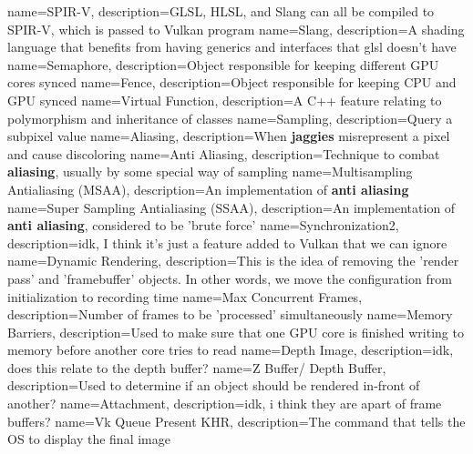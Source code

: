 \documentclass{article}
\begin{document}
\clearpage

\glsaddall

{
name={SPIR-V},
description={GLSL, HLSL, and Slang can all be compiled to SPIR-V,
which is passed to Vulkan program}
}
{
name={Slang},
description={A shading language that benefits from having generics
and interfaces that glsl doesn't have}
}
{
name={Semaphore},
description={Object responsible for keeping different GPU cores synced}
}
{
name={Fence},
description={Object responsible for keeping CPU and GPU synced}
}
{
name={Virtual Function},
description={A C++ feature relating to polymorphism and inheritance
of classes}
}
{
name={Sampling},
description={Query a subpixel value}
}
{
name={Aliasing},
description={When \textbf{jaggies} misrepresent a pixel and cause discoloring}
}
{
name={Anti Aliasing},
description={Technique to combat \textbf{aliasing}, usually by some
special way of sampling}
}
{
name={Multisampling Antialiasing (MSAA)},
description={An implementation of \textbf{anti aliasing}}
}
{
name={Super Sampling Antialiasing (SSAA)},
description={An implementation of \textbf{anti aliasing},
considered to be 'brute force'}
}
{
name={Synchronization2},
description={idk, I think it's just a feature added to Vulkan that we
can ignore}
}
{
name={Dynamic Rendering},
description={This is the idea of removing the 'render pass' and
  'framebuffer' objects. In other words, we move the configuration
from initialization to recording time}
}
{
name={Max Concurrent Frames},
description={Number of frames to be 'processed' simultaneously}
}
{
name={Memory Barriers},
description={Used to make sure that one GPU core is finished
writing to memory before another core tries to read}
}
{
name={Depth Image},
description={idk, does this relate to the depth buffer?}
}
{
name={Z Buffer/ Depth Buffer},
description={Used to determine if an object should be rendered
in-front of another?}
}
{
name={Attachment},
description={idk, i think they are apart of frame buffers?}
}
{
name={Vk Queue Present KHR},
description={The command that tells the OS to display the final image}
}
\end{document}
